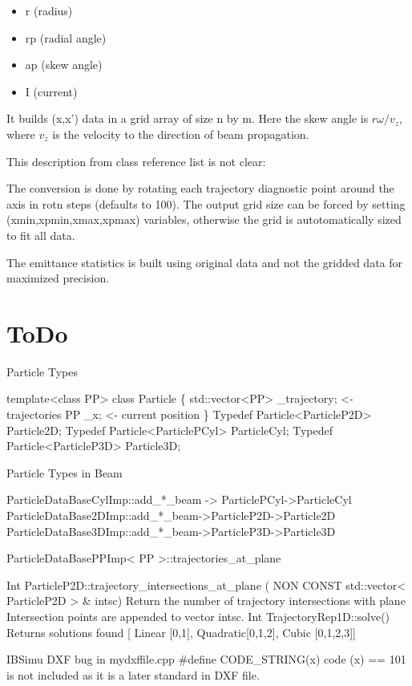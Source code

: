 \documentclass[12pt,a4paper]{article}
\begin{document}
\begin{itemize}
	\item r (radius)
	\item rp (radial angle)
	\item ap (skew angle)
	\item I (current)
\end{itemize}

It builds (x,x') data in a grid array of size n by m. Here the skew angle is $ r\omega/v_z $, where $ v_z $ is the velocity to the direction of beam propagation. 



This description from class reference list is not clear: 

The conversion is done by rotating each trajectory diagnostic point around the axis in rotn steps (defaults to 100). The output grid size can be forced by setting (xmin,xpmin,xmax,xpmax) variables, otherwise the grid is autotomatically sized to fit all data.

The emittance statistics is built using original data and not the gridded data for maximized precision.


\section{ToDo}

Particle Types

template<class PP> class Particle \{
	std::vector<PP> 	\_trajectory; <- trajectories
       PP				\_x; <- current position
\}
Typedef Particle<ParticleP2D> Particle2D;
Typedef Particle<ParticlePCyl> ParticleCyl;
Typedef Particle<ParticleP3D> Particle3D;

Particle Types in Beam

ParticleDataBaseCylImp::add\_*\_beam -> ParticlePCyl->ParticleCyl
ParticleDataBase2DImp::add\_*\_beam->ParticleP2D->Particle2D
ParticleDataBase3DImp::add\_*\_beam->ParticleP3D->Particle3D



ParticleDataBasePPImp< PP >::trajectories\_at\_plane 


Int ParticleP2D::trajectory\_intersections\_at\_plane
( NON CONST	std::vector< ParticleP2D > \& 	intsc)
Return the number of trajectory intersections with plane
Intersection points are appended to vector intsc.
Int TrajectoryRep1D::solve()
Returns solutions found [ Linear [0,1], Quadratic[0,1,2], Cubic [0,1,2,3]]

IBSimu DXF bug in mydxffile.cpp \#define CODE\_STRING(x) code (x) == 101 is not included as it is a later standard in DXF file.
\end{document}
